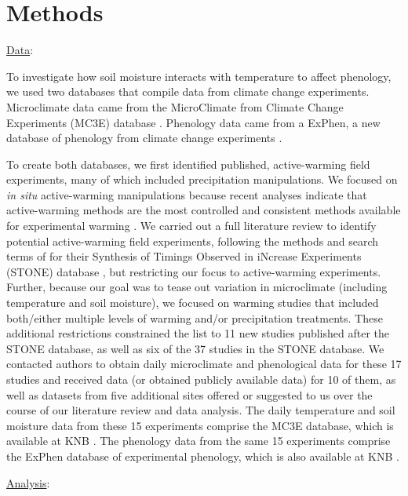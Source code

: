 \documentclass{article}
\begin{document}
\section* {Methods}
\underline{Data}: 
\par To investigate how soil moisture interacts with temperature to affect phenology, we used two databases that compile data from climate change experiments. Microclimate data came from the  MicroClimate from Climate Change Experiments (MC3E) database \cite{ettinger2018}. Phenology data came from a ExPhen, a new database of phenology from climate change experiments \cite{ettinger2018b}. 
\par To create both databases, we first identified published, active-warming field experiments, many of which included precipitation manipulations. We focused on \textit{in situ} active-warming manipulations because recent analyses indicate that active-warming methods are the most controlled and consistent methods available for experimental warming \citep{kimball2005,kimball2008,aronson2009,wolkovich2012}. We carried out a full literature review to identify potential active-warming field experiments, following the methods and search terms of \citet{wolkovich2012} for their Synthesis of Timings Observed in iNcrease Experiments (STONE) database \citep{wolkovich2012}, but restricting our focus to active-warming experiments. Further, because our goal was to tease out variation in microclimate (including temperature and soil moisture), we focused on warming studies that included both/either multiple levels of warming and/or precipitation treatments. These additional restrictions constrained the list to 11 new studies published after the STONE database, as well as six of the 37 studies in the STONE database. We contacted authors to obtain daily microclimate and phenological data for these 17 studies and received data (or obtained publicly available data) for 10 of them, as well as datasets from five additional sites offered or suggested to us over the course of our literature review and data analysis. The daily temperature and soil moisture data from these 15 experiments comprise the MC3E database, which is available at KNB \citep{ettinger2018}. The phenology data from the same 15 experiments comprise the ExPhen database of experimental phenology, which is also available at KNB \citep{ettinger2018b}.

\underline{Analysis}:
\end{document}
